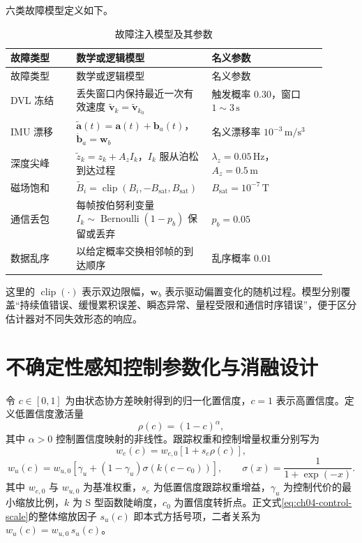 六类故障模型定义如下。

\begin{longtable}{@{}>{\raggedright\arraybackslash}p{0.20\linewidth}>{\raggedright\arraybackslash}p{0.35\linewidth}>{\raggedright\arraybackslash}p{0.35\linewidth}@{}}
\caption{故障注入模型及其参数}\label{tab:app-a-chaos}\\
\toprule
故障类型 & 数学或逻辑模型 & 名义参数 \\
\midrule
\endfirsthead
\toprule
故障类型 & 数学或逻辑模型 & 名义参数 \\
\midrule
\endhead
\bottomrule
\endfoot
DVL 冻结 & 丢失窗口内保持最近一次有效速度 \(\tilde{\boldsymbol v}_k=\tilde{\boldsymbol v}_{k_0}\) & 触发概率 \(0.30\)，窗口 \(1\sim3\,\mathrm{s}\) \\
IMU 漂移 & \(\tilde{\boldsymbol a}(t)=\boldsymbol a(t)+\boldsymbol b_a(t)\)，\(\dot{\boldsymbol b}_a=\boldsymbol w_b\) & 名义漂移率 \(10^{-3}\,\mathrm{m/s^3}\) \\
深度尖峰 & \(\tilde z_k=z_k+A_z I_k\)，\(I_k\) 服从泊松到达过程 & \(\lambda_z=0.05\,\mathrm{Hz}\)，\(A_z=0.5\,\mathrm{m}\) \\
磁场饱和 & \(\tilde B_i=\operatorname{clip}(B_i,-B_{\mathrm{sat}},B_{\mathrm{sat}})\) & \(B_{\mathrm{sat}}=10^{-7}\,\mathrm{T}\) \\
通信丢包 & 每帧按伯努利变量 \(I_k\sim\operatorname{Bernoulli}(1-p_b)\) 保留或丢弃 & \(p_b=0.05\) \\
数据乱序 & 以给定概率交换相邻帧的到达顺序 & 乱序概率 \(0.01\) \\
\end{longtable}

这里的 \(\operatorname{clip}(\cdot)\) 表示双边限幅，\(\boldsymbol w_b\) 表示驱动偏置变化的随机过程。模型分别覆盖“持续值错误、缓慢累积误差、瞬态异常、量程受限和通信时序错误”，便于区分估计器对不同失效形态的响应。

\section{不确定性感知控制参数化与消融设计}\label{sec:app-a-3}

令 \(c\in[0,1]\) 为由状态协方差映射得到的归一化置信度，\(c=1\) 表示高置信度。定义低置信度激活量
\begin{equation}
  \rho(c)=(1-c)^\alpha ,
  \label{eq:app-confidence-activation}
\end{equation}
其中 \(\alpha>0\) 控制置信度映射的非线性。跟踪权重和控制增量权重分别写为
\begin{equation}
  w_e(c)=w_{e,0}\left[1+s_e\rho(c)\right],
  \label{eq:app-track-weight}
\end{equation}
\begin{equation}
  w_u(c)=w_{u,0}
  \left[
    \gamma_u+(1-\gamma_u)
    \sigma\!\left(k(c-c_0)\right)
  \right],
  \qquad
  \sigma(x)=\frac{1}{1+\exp(-x)}.
  \label{eq:app-control-weight}
\end{equation}
其中 \(w_{e,0}\) 与 \(w_{u,0}\) 为基准权重，\(s_e\) 为低置信度跟踪权重增益，\(\gamma_u\) 为控制代价的最小缩放比例，\(k\) 为 S 型函数陡峭度，\(c_0\) 为置信度转折点。正文式\eqref{eq:ch04-control-scale}的整体缩放因子 \(s_u(c)\) 即本式方括号项，二者关系为 \(w_u(c)=w_{u,0}\,s_u(c)\)。

